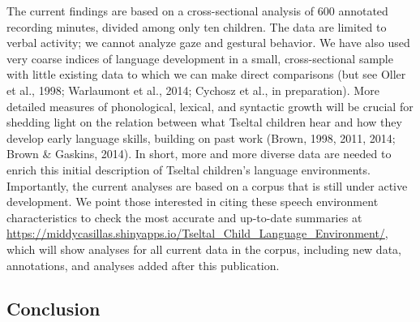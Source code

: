 \documentclass[,man,floatsintext]{apa6}
\begin{document}
The current findings are based on a cross-sectional analysis of 600
annotated recording minutes, divided among only ten children. The data
are limited to verbal activity; we cannot analyze gaze and gestural
behavior. We have also used very coarse indices of language development
in a small, cross-sectional sample with little existing data to which we
can make direct comparisons (but see Oller et al., 1998; Warlaumont et
al., 2014; Cychosz et al., in preparation). More detailed measures of
phonological, lexical, and syntactic growth will be crucial for shedding
light on the relation between what Tseltal children hear and how they
develop early language skills, building on past work (Brown, 1998, 2011,
2014; Brown \& Gaskins, 2014). In short, more and more diverse data are
needed to enrich this initial description of Tseltal children's language
environments. Importantly, the current analyses are based on a corpus
that is still under active development. We point those interested in
citing these speech environment characteristics to check the most
accurate and up-to-date summaries at
\url{https://middycasillas.shinyapps.io/Tseltal_Child_Language_Environment/},
which will show analyses for all current data in the corpus, including
new data, annotations, and analyses added after this publication.

\subsection{Conclusion}\label{disc-conclusion}
\end{document}
